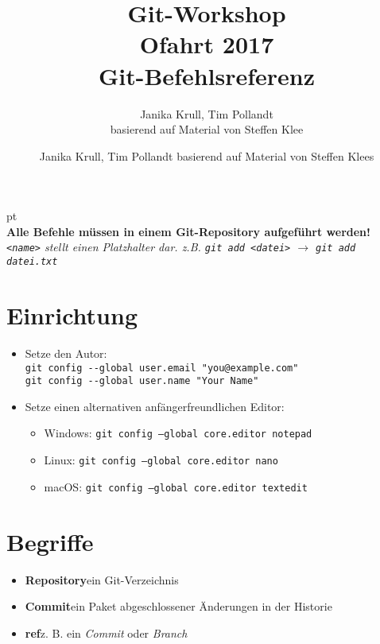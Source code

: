 \documentclass[accentcolor=tud8b,colorbacktitle,12pt]{tudexercise}
\author{Janika Krull, Tim Pollandt basierend auf Material von Steffen Klees}
\begin{document}
\title{Git-Workshop\\Ofahrt 2017\\Git-Befehlsreferenz}
\subtitle{Janika Krull, Tim Pollandt\\\tiny{basierend auf Material von Steffen Klee}}
\maketitle

 pt\\
\textbf{Alle Befehle müssen in einem Git-Repository aufgeführt werden!}\\
\textit{\lstinline|<name>| stellt einen Platzhalter dar. z.B. \lstinline|git add <datei>| $\rightarrow$ \lstinline|git add datei.txt|}
\section*{Einrichtung}
\begin{itemize}
	\item Setze den Autor:\\
	\lstinline|git config --global user.email "you@example.com"|\\
	\lstinline|git config --global user.name "Your Name"|

	\item Setze einen alternativen anfängerfreundlichen Editor:
	\begin{itemize}
		\item Windows: \tab\texttt{git config --global core.editor notepad}
		\item Linux: \tab\texttt{git config --global core.editor nano}
		\item macOS: \tab\texttt{git config --global core.editor textedit}
	\end{itemize}
\end{itemize}

\section*{Begriffe}
\begin{itemize}
	\item \textbf{Repository}\tab ein Git-Verzeichnis
	\item \textbf{Commit}\tab ein Paket abgeschlossener Änderungen in der Historie
	\item \textbf{ref}\tab z. B. ein \textit{Commit} oder \textit{Branch}
\end{itemize}
\end{document}
